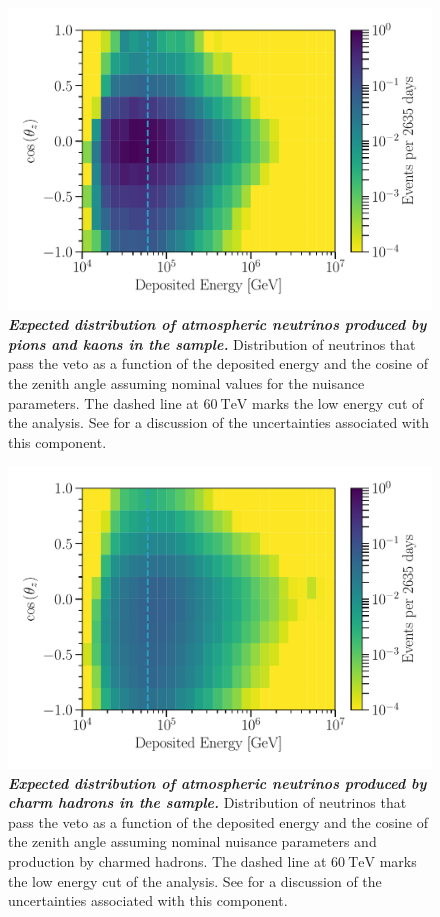 \begin{figure}
	\centering
	\includegraphics[width=\linewidth]{figures/hese_paper/diffuse_hist_all_conv}
	\internallinenumbers
	\caption{\textbf{\textit{Expected distribution of atmospheric neutrinos produced by pions and kaons in the sample.}} Distribution of neutrinos that pass the veto as a function of the deposited energy and the cosine of the zenith angle assuming nominal values for the nuisance parameters.
		The dashed line at $\SI{60}\TeV$ marks the low energy cut of the analysis.
		See  for a discussion of the uncertainties associated with this component.}\label{fig:conventional_distribution}
\end{figure}

\begin{figure}
	\centering
	\includegraphics[width=\linewidth]{figures/hese_paper/diffuse_hist_all_prompt}
	\internallinenumbers
	\caption{\textbf{\textit{Expected distribution of atmospheric neutrinos produced by charm hadrons in the sample.}} Distribution of neutrinos that pass the veto as a function of the deposited energy and the cosine of the zenith angle assuming nominal nuisance parameters and production by charmed hadrons.
		The dashed line at $\SI{60}\TeV$ marks the low energy cut of the analysis.
		See  for a discussion of the uncertainties associated with this component.}\label{fig:prompt_distribution}
\end{figure}

